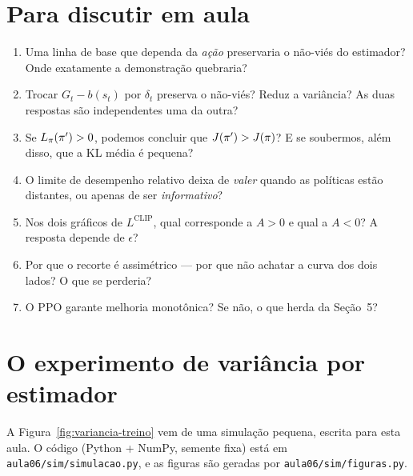 \documentclass[11pt, a4paper]{article}
\newcommand{\Adv}{A}
\newcommand{\polnovo}{\pol'}
\newcommand{\Lsub}[1]{L_{#1}}
\begin{document}
\needspace{0.42\textheight}
\section{Para discutir em aula}

\begin{discbox}
\begin{enumerate}[itemsep=0.35em]
  \item Uma linha de base que dependa da \emph{ação} preservaria o não-viés do
        estimador? Onde exatamente a demonstração quebraria?
  \item Trocar $G_t - b(s_t)$ por $\delta_t$ preserva o não-viés? Reduz a
        variância? As duas respostas são independentes uma da outra?
  \item Se $\Lsub{\pol}(\polnovo) > 0$, podemos concluir que
        $J(\polnovo) > J(\pol)$? E se soubermos, além disso, que a KL média é
        pequena?
  \item O limite de desempenho relativo deixa de \emph{valer} quando as
        políticas estão distantes, ou apenas de ser \emph{informativo}?
  \item Nos dois gráficos de $L^{\mathrm{CLIP}}$, qual corresponde a
        $\Adv > 0$ e qual a $\Adv < 0$? A resposta depende de $\epsilon$?
  \item Por que o recorte é assimétrico --- por que não achatar a curva dos
        dois lados? O que se perderia?
  \item O PPO garante melhoria monotônica? Se não, o que herda da Seção~5?
\end{enumerate}
\end{discbox}

\appendix
\section{O experimento de variância por estimador}
\label{ap:sim}

A Figura~\ref{fig:variancia-treino} vem de uma simulação pequena, escrita para
esta aula. O código (Python + NumPy, semente fixa) está em
\texttt{aula06/sim/simulacao.py}, e as figuras são geradas por
\texttt{aula06/sim/figuras.py}.
\end{document}
